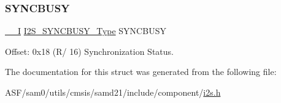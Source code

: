 \mbox{\label{struct_i2s_a1d9f6b5b2c5834e95df7ab5fd89b5059}} 
\subsubsection{\texorpdfstring{SYNCBUSY}{SYNCBUSY}}
{\footnotesize\ttfamily \mbox{\hyperlink{core__cm0plus_8h_af63697ed9952cc71e1225efe205f6cd3}{\+\_\+\+\_\+I}} \mbox{\hyperlink{union_i2_s___s_y_n_c_b_u_s_y___type}{I2\+S\+\_\+\+S\+Y\+N\+C\+B\+U\+S\+Y\+\_\+\+Type}} S\+Y\+N\+C\+B\+U\+SY}



Offset\+: 0x18 (R/ 16) Synchronization Status. 



The documentation for this struct was generated from the following file\+:\begin{DoxyCompactItemize}
\item 
A\+S\+F/sam0/utils/cmsis/samd21/include/component/\mbox{\hyperlink{component_2i2s_8h}{i2s.\+h}}\end{DoxyCompactItemize}

